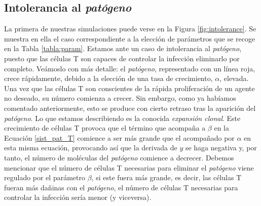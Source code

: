 \subsection{Intolerancia al \textit{patógeno}}
\label{sim:intoler}

La primera de nuestras simulaciones puede verse en la Figura \ref{fig:intolerance}. Se muestra en ella el caso correspondiente a la elección de parámetros que se recoge en la Tabla \ref{tabla:param}. Estamos ante un caso de intolerancia al \textit{patógeno}, puesto que las células T son capaces de controlar la infección eliminarlo por completo. Veámoslo con más detalle: el \textit{patógeno}, representado con un línea roja, crece rápidamente, debido a la elección de una tasa de crecimiento, $\alpha$, elevada. Una vez que las células T son conscientes de la rápida proliferación de un agente no deseado, su número comienza a crecer. Sin embargo, como ya habíamos comentado anteriormente, esto se produce con cierto retraso tras la aparición del \textit{patógeno}. Lo que estamos describiendo es la conocida \textit{expansión clonal}. Este crecimiento de células T provoca que el término que acompaña a $\beta$ en la Ecuación \ref{sist_pat_T} comience a ser más grande que el acompañado por $\alpha$ en esta misma ecuación, provocando así que la derivada de $y$ se haga negativa y, por tanto, el número de moléculas del \textit{patógeno} comience a decrecer. Debemos mencionar que el número de células T necesarias para eliminar el \textit{patógeno} viene regulado por el parámetro $\beta$, si este fuera más grande, es decir, las células T fueran más dañinas con el \textit{patógeno}, el número de células T necesarias para controlar la infección sería menor (y viceversa).


